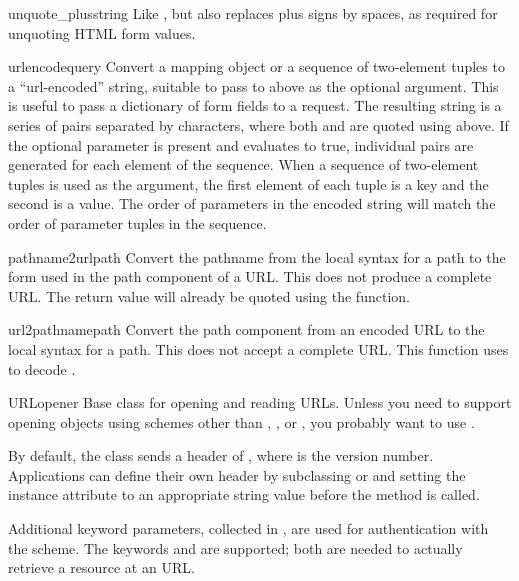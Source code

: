 \begin{funcdesc}{unquote_plus}{string}
Like , but also replaces plus signs by spaces, as
required for unquoting HTML form values.
\end{funcdesc}

\begin{funcdesc}{urlencode}{query}
Convert a mapping object or a sequence of two-element tuples  to a
``url-encoded'' string, suitable to pass to 
 above as the optional  argument.  This
is useful to pass a dictionary of form fields to a 
request.  The resulting string is a series of
 pairs separated by \character{\&}
characters, where both  and  are quoted using
 above.  If the optional parameter  is
present and evaluates to true, individual  pairs
are generated for each element of the sequence.
When a sequence of two-element tuples is used as the  argument,
the first element of each tuple is a key and the second is a value.  The
order of parameters in the encoded string will match the order of parameter
tuples in the sequence.
\end{funcdesc}

\begin{funcdesc}{pathname2url}{path}
Convert the pathname  from the local syntax for a path to
the form used in the path component of a URL.  This does not produce a
complete URL.  The return value will already be quoted using the
 function.
\end{funcdesc}

\begin{funcdesc}{url2pathname}{path}
Convert the path component  from an encoded URL to the local
syntax for a path.  This does not accept a complete URL.  This
function uses  to decode .
\end{funcdesc}

\begin{classdesc}{URLopener}{}
Base class for opening and reading URLs.  Unless you need to support
opening objects using schemes other than , ,
 or , you probably want to use
.

By default, the  class sends a
 header of , where
 is the  version number.  Applications can
define their own  header by subclassing
 or  and setting the instance
attribute  to an appropriate string value before the
 method is called.

Additional keyword parameters, collected in , are used for
authentication with the  scheme.  The keywords
 and  are supported; both are needed to
actually retrieve a resource at an  URL.
\end{classdesc}

